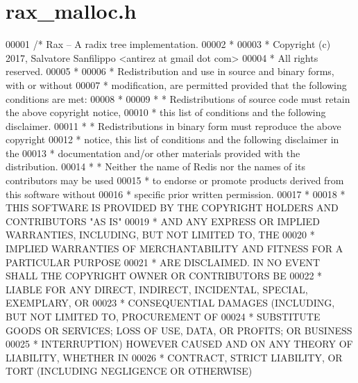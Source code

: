 \hypertarget{rax__malloc_8h_source}{}\section{rax\+\_\+malloc.\+h}
\label{rax__malloc_8h_source}

\begin{DoxyCode}
00001 \textcolor{comment}{/* Rax -- A radix tree implementation.}
00002 \textcolor{comment}{ *}
00003 \textcolor{comment}{ * Copyright (c) 2017, Salvatore Sanfilippo <antirez at gmail dot com>}
00004 \textcolor{comment}{ * All rights reserved.}
00005 \textcolor{comment}{ *}
00006 \textcolor{comment}{ * Redistribution and use in source and binary forms, with or without}
00007 \textcolor{comment}{ * modification, are permitted provided that the following conditions are met:}
00008 \textcolor{comment}{ *}
00009 \textcolor{comment}{ *   * Redistributions of source code must retain the above copyright notice,}
00010 \textcolor{comment}{ *     this list of conditions and the following disclaimer.}
00011 \textcolor{comment}{ *   * Redistributions in binary form must reproduce the above copyright}
00012 \textcolor{comment}{ *     notice, this list of conditions and the following disclaimer in the}
00013 \textcolor{comment}{ *     documentation and/or other materials provided with the distribution.}
00014 \textcolor{comment}{ *   * Neither the name of Redis nor the names of its contributors may be used}
00015 \textcolor{comment}{ *     to endorse or promote products derived from this software without}
00016 \textcolor{comment}{ *     specific prior written permission.}
00017 \textcolor{comment}{ *}
00018 \textcolor{comment}{ * THIS SOFTWARE IS PROVIDED BY THE COPYRIGHT HOLDERS AND CONTRIBUTORS "AS IS"}
00019 \textcolor{comment}{ * AND ANY EXPRESS OR IMPLIED WARRANTIES, INCLUDING, BUT NOT LIMITED TO, THE}
00020 \textcolor{comment}{ * IMPLIED WARRANTIES OF MERCHANTABILITY AND FITNESS FOR A PARTICULAR PURPOSE}
00021 \textcolor{comment}{ * ARE DISCLAIMED. IN NO EVENT SHALL THE COPYRIGHT OWNER OR CONTRIBUTORS BE}
00022 \textcolor{comment}{ * LIABLE FOR ANY DIRECT, INDIRECT, INCIDENTAL, SPECIAL, EXEMPLARY, OR}
00023 \textcolor{comment}{ * CONSEQUENTIAL DAMAGES (INCLUDING, BUT NOT LIMITED TO, PROCUREMENT OF}
00024 \textcolor{comment}{ * SUBSTITUTE GOODS OR SERVICES; LOSS OF USE, DATA, OR PROFITS; OR BUSINESS}
00025 \textcolor{comment}{ * INTERRUPTION) HOWEVER CAUSED AND ON ANY THEORY OF LIABILITY, WHETHER IN}
00026 \textcolor{comment}{ * CONTRACT, STRICT LIABILITY, OR TORT (INCLUDING NEGLIGENCE OR OTHERWISE)}

\end{DoxyCode}
